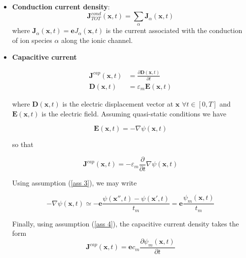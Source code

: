 \documentclass[12pt, a4paper]{report}
\begin{document}
\begin{itemize}
	
	\item \textbf{Conduction current density}: 
	\begin{equation}
	\textbf{J}^{cond}_{TOT}(\textbf{x},t) = \sum_{\alpha} \textbf{J}_{\alpha}(\textbf{x},t)
	\end{equation}
	where $\textbf{J}_{\alpha}(\textbf{x},t) = \textbf{e} J_{\alpha}(\textbf{x},t)$ is the current associated with the conduction of ion species $\alpha$ along the ionic channel.
	
	\item \textbf{Capacitive current} 
	
	\begin{align}
	\textbf{J}^{cap}(\textbf{x},t) &= \frac{\partial \textbf{D}(\textbf{x},t)}{\partial t}\\	
	\textbf{D}(\textbf{x},t) &= \varepsilon_m \textbf{E}(\textbf{x},t)
	\end{align}
	
	
	
	
	where $\textbf{D}(\textbf{x},t)$ is the electric displacement vector at $\textbf{x}$ $\forall t \in [0,T]$ and $\textbf{E}(\textbf{x},t)$ is the electric field. Assuming quasi-static conditions we have
	
	\begin{equation}
	\textbf{E}(\textbf{x},t) = - \nabla \psi(\textbf{x},t)
	\end{equation}
	
	so that
	
	\begin{equation}
	\textbf{J}^{cap}(\textbf{x},t) = -\varepsilon_m \frac{\partial}{\partial t}\nabla \psi(\textbf{x},t)
	\end{equation}
	
	
	
	Using assumption (\ref{ass 3}), we may write 
	
	$$ - \nabla \psi(\textbf{x},t) \simeq - \textbf{e} \frac{\psi(\textbf{x}'',t) - \psi(\textbf{x}',t)}{t_m} = \textbf{e} \frac{\psi_m(\textbf{x},t) }{t_m} $$
	
	Finally, using assumption (\ref{ass 4}), the capacitive current density takes the form
	\begin{equation}
	\textbf{J}^{cap}(\textbf{x},t) = \textbf{e} c_m \frac{\partial \psi_m (\textbf{x},t)}{\partial t}
	\end{equation}
\end{itemize}	
\end{document}

